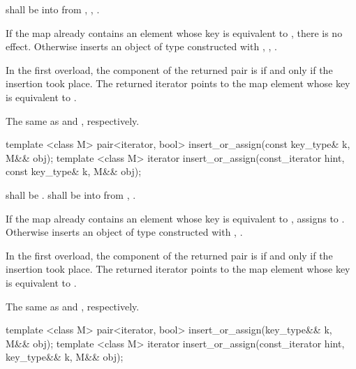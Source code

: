 \begin{itemdescr}
\pnum
\requires
{} shall be  into 
from , ,
.

\pnum
\effects
If the map already contains an element
whose key is equivalent to ,
there is no effect.
Otherwise inserts an object of type 
constructed with , ,
.

\pnum
\returns
In the first overload,
the  component of the returned pair is 
if and only if the insertion took place.
The returned iterator points to the map element
whose key is equivalent to .

\pnum
\complexity
The same as  and ,
respectively.
\end{itemdescr}

%
\begin{itemdecl}
template <class M> pair<iterator, bool> insert_or_assign(const key_type& k, M&& obj);
template <class M> iterator insert_or_assign(const_iterator hint, const key_type& k, M&& obj);
\end{itemdecl}

\begin{itemdescr}
\pnum
\requires
{} shall be .
 shall be  into 
from , .

\pnum
\effects
If the map already contains an element 
whose key is equivalent to ,
assigns  to .
Otherwise inserts an object of type 
constructed with , .

\pnum
\returns
In the first overload,
the  component of the returned pair is 
if and only if the insertion took place.
The returned iterator points to the map element
whose key is equivalent to .

\pnum
\complexity
The same as  and ,
respectively.
\end{itemdescr}

%
\begin{itemdecl}
template <class M> pair<iterator, bool> insert_or_assign(key_type&& k, M&& obj);
template <class M> iterator insert_or_assign(const_iterator hint, key_type&& k, M&& obj);
\end{itemdecl}

